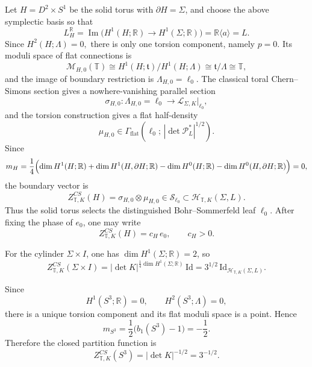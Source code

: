 \documentclass[12pt]{amsart}
\numberwithin{equation}{section}
\begin{document}
Let \(H=D^2\times S^1\) be the solid torus with \(\partial H=\Sigma\), and choose the above
symplectic basis so that
\[
L_H^{\mathbb R}
=
\operatorname{Im}\bigl(H^1(H;\mathbb R)\to H^1(\Sigma;\mathbb R)\bigr)
=
\mathbb R\langle a\rangle
=
L.
\]
Since \(H^2(H;\Lambda)=0,\) there is only one torsion component, namely \(p=0\). Its moduli space of flat connections is
\[
\mathcal M_{H,0}(\mathbb T)
\cong
H^1(H;\mathfrak t)/H^1(H;\Lambda)
\cong
\mathfrak t/\Lambda
\cong
\mathbb T,
\]
and the image of boundary restriction is \(\mathcal \Lambda_{H,0}=\ell_0.\) The classical toral Chern--Simons section gives a nowhere-vanishing parallel section
\[
\sigma_{H,0}:\mathcal \Lambda_{H,0}=\ell_0
\longrightarrow
\mathcal L_{\Sigma,K}|_{\ell_0},
\]
and the torsion construction gives a flat half-density
\[
\mu_{H,0}\in
\Gamma_{\mathrm{flat}}
\!\left(
\ell_0;\,|\det \mathcal P_L^*|^{1/2}
\right).
\]
Since
\[
m_H
=
\frac14\Bigl(
\dim H^1(H;\mathbb R)+\dim H^1(H,\partial H;\mathbb R)
-\dim H^0(H;\mathbb R)-\dim H^0(H,\partial H;\mathbb R)
\Bigr)=0,
\]
the boundary vector is
\[
Z^{CS}_{\mathbb T,K}(H)=\sigma_{H,0}\otimes \mu_{H,0}\in \mathcal S_{\ell_0}\subset \mathcal H_{\mathbb T,K}(\Sigma,L).
\]
Thus the solid torus selects the distinguished Bohr--Sommerfeld leaf \(\ell_0\).
After fixing the phase of \(e_0\), one may write
\[
Z^{CS}_{\mathbb T,K}(H)=c_H\,e_0,
\qquad c_H>0.
\]


For the cylinder \(\Sigma\times I\), one has \(\dim H^1(\Sigma;\mathbb R)=2\), so
\[
Z^{CS}_{\mathbb T,K}(\Sigma\times I)
=
|\det K|^{\frac14\dim H^1(\Sigma;\mathbb R)}\,\mathrm{Id}
=
3^{1/2}\,\mathrm{Id}_{\mathcal H_{\mathbb T,K}(\Sigma,L)}.
\]


Since
\[
H^1(S^3;\mathbb R)=0,
\qquad
H^2(S^3;\Lambda)=0,
\]
there is a unique torsion component and its flat moduli space is a point. Hence
\[
m_{S^3}=\frac12\bigl(b_1(S^3)-1\bigr)=-\frac12.
\]
Therefore the closed partition function is
\[
Z^{CS}_{\mathbb T,K}(S^3)=|\det K|^{-1/2}=3^{-1/2}.
\]
\end{document}
